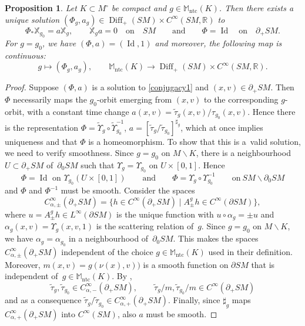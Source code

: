 \documentclass[10pt,a4paper]{amsart}
\numberwithin{equation}{section}
\newtheorem{Proposition}[Theorem]{Proposition}
\theoremstyle{definition}
\newcommand{\R}{\mathbb{R}} %
\newcommand{\M}{\mathbb{M}}
\newcommand{\1}{{\bf 1}}
\newcommand{\Id}{\operatorname{Id}}
\newcommand{\ntc}{\mathrm{ntc}}
\DeclareMathOperator{\Diff}{Diff}
\begin{document}
\begin{Proposition}
	Let $K\subset M^\circ$ be compact and $g\in \M_\ntc(K)$. Then there exists a unique solution $(\Phi_g,a_g)\in \Diff_+(SM)\times C^\infty(SM,\R)$ to
	\begin{equation}\label{conjugacy1}
		\Phi_*\mathbb X_{g_0} = a\mathbb X_{g}, \qquad \mathbb X_g a = 0\quad \text{on} \quad SM\qquad \text{and} \qquad \Phi = \Id\quad \text{on}\quad \partial_+SM.
	\end{equation}
	For $g=g_0$, we have $(\Phi,a)=(\Id,1)$ and moreover, the following map is continuous:
	\[g\mapsto (\Phi_g,a_g),\qquad \M_\ntc(K) \rightarrow \Diff_+(SM)\times C^\infty(SM,\R).\]
\end{Proposition}


\begin{proof}
Suppose $(\Phi,a)$ is a solution to \eqref{conjugacy1} and $(x,v)\in \partial_+SM$. Then $\Phi$ necessarily maps the $g_0$-orbit emerging from $(x,v)$
to the corresponding $g$-orbit, with a constant time change $a(x,v)=\tilde \tau_g(x,v)/\tau_{g_0}(x,v)$. Hence there is the representation
$
\Phi= \tilde \Upsilon_g\circ \tilde \Upsilon_{g_0}^{-1}$, $ a= [\tilde \tau_g/\tilde \tau_{g_0}]^{\sharp_{g}}$,
which at once implies uniqueness and that $\Phi$ is a homeomorphism. To show that this is a~valid solution, we need to verify smoothness. Since $g=g_0$ on $M\backslash K$, there is a neighbourhood $U\subset \partial_+SM$ of~$\partial_0SM$ such that $\Upsilon_{g}=\Upsilon_{g_0}$ on $U\times [0,1]$. Hence
\[
	\Phi = \Id \text{ on } \Upsilon_{g_0}(U\times [0,1])\qquad \text{and} \qquad \Phi = \Upsilon_g\circ \Upsilon_{g_0}^{-1}\qquad \text{on}\  SM\backslash \partial_0SM
\]
and $\Phi$ and $\Phi^{-1}$ must be smooth. Consider the spaces
\[
	C_{\alpha,\pm}^\infty(\partial_+SM)=\big\{h\in C^\infty(\partial_+SM)\mid A_{\pm}^g h \in C^\infty(\partial SM)\big\},
\]
where $u=A_{\pm}^g h\in L^\infty(\partial SM)$ is the unique function with $u\circ \alpha_g =\pm u$ and $\alpha_g(x,v)=\Upsilon_{g}(x,v,1)$ is the scattering relation of~$g$. Since $g=g_0$ on $M\backslash K$, we have $\alpha_{g}=\alpha_{g_0}$ in a neighbourhood of~$\partial_0SM$. This makes the spaces $C_{\alpha,\pm}^\infty(\partial_+SM)$ independent of the choice $g\in \M_\ntc(K)$ used in their definition. Moreover, $m(x,v)={g(\nu(x),v))}$ is a smooth function on $\partial SM$ that is independent of~${g\in \M_\ntc(K)}$. By \cite[Section 3.2]{PSU23},
\[
	\tilde \tau_{g}, \tilde\tau_{g_0} \in C^\infty_{\alpha,-}(\partial_+SM),\qquad \tilde \tau_g/m,\tilde \tau_{g_0}/m\in C^\infty(\partial_+SM)
\]
and as a consequence $\tilde \tau_g/\tilde \tau_{g_0} \in C^\infty_{\alpha,+}(\partial_+SM).$
Finally, since $\sharp_g$ maps $C^\infty_{\alpha,+}(\partial_+SM)$ into $C^\infty(SM)$, also $a$ must be smooth.


\end{proof}
\end{document}

